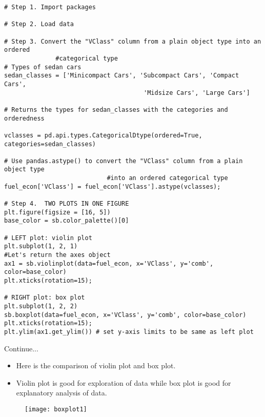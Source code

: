 \documentclass[12pt]{beamer}
\begin{document}
    \begin{frame}[fragile]{}
    	\fontsize{9}{0.5}
    	\begin{verbatim}
# Step 1. Import packages

# Step 2. Load data

# Step 3. Convert the "VClass" column from a plain object type into an ordered 
              #categorical type 
# Types of sedan cars
sedan_classes = ['Minicompact Cars', 'Subcompact Cars', 'Compact Cars', 
                                      'Midsize Cars', 'Large Cars']

# Returns the types for sedan_classes with the categories and orderedness

vclasses = pd.api.types.CategoricalDtype(ordered=True, categories=sedan_classes)

# Use pandas.astype() to convert the "VClass" column from a plain object type 
                            #into an ordered categorical type 
fuel_econ['VClass'] = fuel_econ['VClass'].astype(vclasses);

# Step 4.  TWO PLOTS IN ONE FIGURE
plt.figure(figsize = [16, 5])
base_color = sb.color_palette()[0]

# LEFT plot: violin plot
plt.subplot(1, 2, 1)
#Let's return the axes object
ax1 = sb.violinplot(data=fuel_econ, x='VClass', y='comb', color=base_color)
plt.xticks(rotation=15);

# RIGHT plot: box plot
plt.subplot(1, 2, 2)
sb.boxplot(data=fuel_econ, x='VClass', y='comb', color=base_color)
plt.xticks(rotation=15);
plt.ylim(ax1.get_ylim()) # set y-axis limits to be same as left plot
    	\end{verbatim}
    \end{frame}
    \begin{frame}{Continue...}
    	\begin{itemize}
    		\item Here is the comparison of violin plot and box plot. 
    		\item Violin plot is good for exploration of data while box plot is good for explanatory analysis of data.
    	\end{itemize}
        \begin{figure}
        	\centering
        	\texttt{[image: boxplot1]}
        \end{figure}
    \end{frame}
\end{document}
